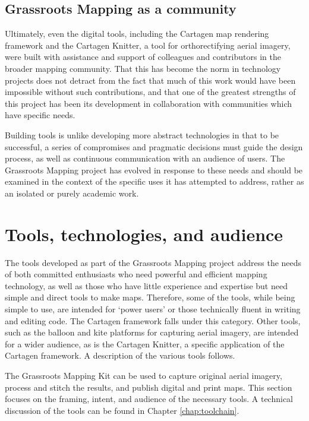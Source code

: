 \documentclass[11pt,oneside,notitlepage]{report}
\begin{document}
{{\subsection{Grassroots Mapping as a community}

Ultimately, even the digital tools, including the Cartagen map rendering framework and the Cartagen Knitter, a tool for orthorectifying aerial imagery, were built with assistance and support of colleagues and contributors in the broader mapping community. That this has become the norm in technology projects does not detract from the fact that much of this work would have been impossible without such contributions, and that one of the greatest strengths of this project has been its development in collaboration with communities which have specific needs. 

Building tools is unlike developing more abstract technologies in that to be successful, a series of compromises and pragmatic decisions must guide the design process, as well as continuous communication with an audience of users. The Grassroots Mapping project has evolved in response to these needs and should be examined in the context of the specific uses it has attempted to address, rather as an isolated or purely academic work.

\section{Tools, technologies, and audience}

The tools developed as part of the Grassroots Mapping project address the needs of both committed enthusiasts who need powerful and efficient mapping technology, as well as those who have little experience and expertise but need simple and direct tools to make maps. Therefore, some of the tools, while being simple to use, are intended for `power users' or those technically fluent in writing and editing code. The Cartagen framework falls under this category. Other tools, such as the balloon and kite platforms for capturing aerial imagery, are intended for a wider audience, as is the Cartagen Knitter, a specific application of the Cartagen framework. A description of the various tools follows.

The Grassroots Mapping Kit can be used to capture original aerial imagery, process and stitch the results, and publish digital and print maps. This section focuses on the framing, intent, and audience of the necessary tools. A technical discussion of the tools can be found in Chapter \ref{chap:toolchain}. 

}}
\end{document}
